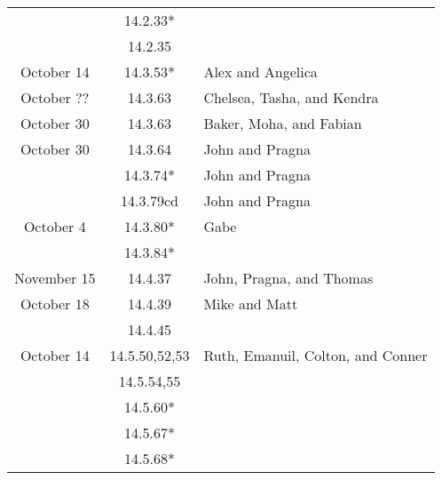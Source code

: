 \documentclass[12pt]{amsart}
\begin{document}
\begin{longtable}{c|c|l}
                        & 14.2.33*                             &                                          \\
                        & 14.2.35                              &                                          \\
        October 14      & 14.3.53*                             & Alex and Angelica                        \\
        October ??      & 14.3.63                              & Chelsea, Tasha, and Kendra               \\
        October 30      & 14.3.63                              & Baker, Moha, and Fabian                  \\
        October 30      & 14.3.64                              & John and Pragna                          \\
                        & 14.3.74*                             & John and Pragna                          \\
                        & 14.3.79cd                            & John and Pragna                          \\
        October 4       & 14.3.80*                             & Gabe                                     \\
                        & 14.3.84*                             &                                          \\
        November 15     & 14.4.37                              & John, Pragna, and Thomas                 \\
        October 18      & 14.4.39                              & Mike and Matt                            \\
                        & 14.4.45                              &                                          \\
        October 14      & 14.5.50,52,53                        & Ruth, Emanuil, Colton, and Conner        \\
                        & 14.5.54,55                           &                                          \\
                        & 14.5.60*                             &                                          \\
                        & 14.5.67*                             &                                          \\
                        & 14.5.68*                             &                                          \\

\end{longtable}
\end{document}
